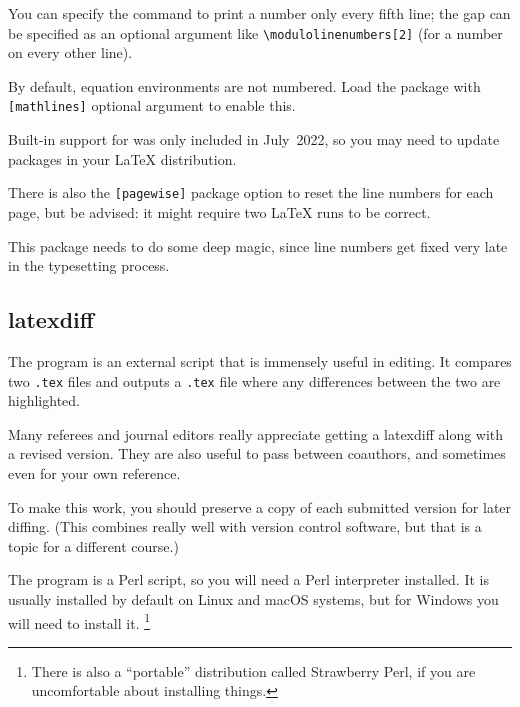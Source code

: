You can specify the  command to print a number only every fifth line;
the gap can be specified as an optional argument like \verb|\modulolinenumbers[2]|
(for a number on every other line).

By default, equation environments are not numbered.
Load the package with \verb|[mathlines]| optional argument to enable this.

\begin{gotcha}
Built-in support for 
was only included in July~2022,
so you may need to update packages in your \LaTeX{} distribution.
\end{gotcha}

There is also the \verb|[pagewise]| package option
to reset the line numbers for each page, but be advised:
it might require two \LaTeX{} runs to be correct.

\begin{technote}
This package needs to do some deep magic,
since line numbers get fixed very late in the typesetting process.
\end{technote}


%
\subsection{latexdiff}

The  program is an external script that is immensely useful in editing.
It compares two \verb|.tex| files and outputs a \verb|.tex| file
where any differences between the two are highlighted.

\begin{practices}
Many referees and journal editors really appreciate getting a latexdiff along with a revised version.
They are also useful to pass between coauthors,
and sometimes even for your own reference.

To make this work, you should preserve a copy of each submitted version for later diffing.
(This combines really well with version control software,
but that is a topic for a different course.)
\end{practices}

The  program is a Perl script,
so you will need a Perl interpreter installed.
It is usually installed by default on Linux and macOS systems,
but for Windows you will need to install it.%
\footnote{There is also a ``portable'' distribution called Strawberry Perl,
if you are uncomfortable about installing things.}

